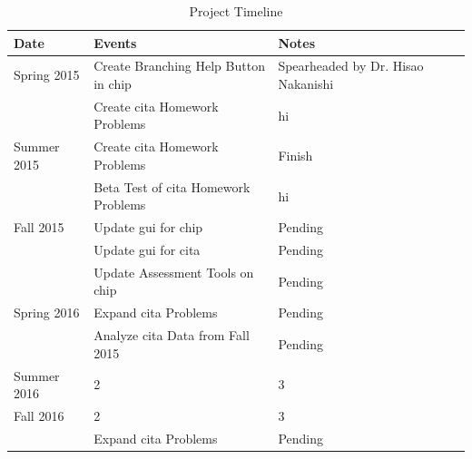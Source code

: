 \begin{table}[!ht]
  \centering
  \begin{tabular}{|l|l|l|l|}
    \hline
    \textbf{Date} & \textbf{Events} & \textbf{Notes}\\
	\hline
	Spring 2015 & Create Branching Help Button in \gls{chip} & Spearheaded by Dr. Hisao Nakanishi\\
	& Create \gls{cita} Homework Problems & hi\\
	\hline
	Summer 2015 & Create \gls{cita} Homework Problems & Finish\\
	& Beta Test of \gls{cita} Homework Problems & hi\\
	\hline
	Fall 2015 & Update \gls{gui} for \gls{chip} & Pending\\
	& Update \gls{gui} for \gls{cita} & Pending\\
	& Update Assessment Tools on \gls{chip} & Pending\\
	\hline
	Spring 2016 & Expand \gls{cita} Problems & Pending\\
	& Analyze \gls{cita} Data from Fall 2015 & Pending\\
	Summer 2016 & 2 & 3\\
	Fall 2016 & 2 & 3\\
	& Expand \gls{cita} Problems & Pending\\
	\hline
  \end{tabular}
  \caption{Project Timeline}
  \label{tab:timeline}
\end{table}